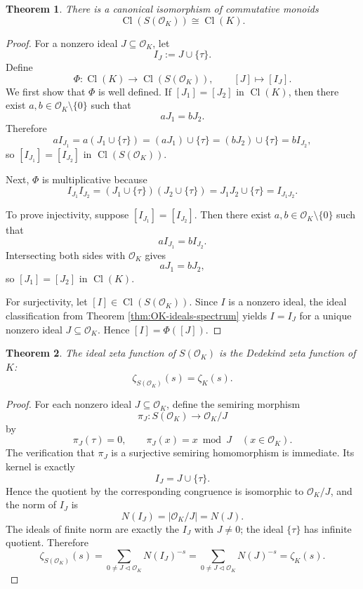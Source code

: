 \documentclass[11pt]{article}
\newtheorem{theorem}{Theorem}[section]
\theoremstyle{definition}
\newcommand{\Cl}{\operatorname{Cl}}
\newcommand{\taup}{\tau}
\newcommand{\OK}{\mathcal O_K}
\begin{document}
\begin{theorem}\label{thm:class-semigroup}
There is a canonical isomorphism of commutative monoids
\[
\Cl(S(\OK))\cong \Cl(K).
\]
\end{theorem}

\begin{proof}
For a nonzero ideal \(J\subseteq \OK\), let
\[
I_J:=J\cup\{\taup\}.
\]
Define
\[
\Phi:\Cl(K)\longrightarrow \Cl(S(\OK)),
\qquad
[J]\longmapsto [I_J].
\]
We first show that \(\Phi\) is well defined.  If \([J_1]=[J_2]\) in \(\Cl(K)\), then there exist \(a,b\in\OK\setminus\{0\}\) such that
\[
aJ_1=bJ_2.
\]
Therefore
\[
aI_{J_1}=a(J_1\cup\{\taup\})=(aJ_1)\cup\{\taup\}=(bJ_2)\cup\{\taup\}=bI_{J_2},
\]
so \([I_{J_1}]=[I_{J_2}]\) in \(\Cl(S(\OK))\).

Next, \(\Phi\) is multiplicative because
\[
I_{J_1}I_{J_2}=(J_1\cup\{\taup\})(J_2\cup\{\taup\})=J_1J_2\cup\{\taup\}=I_{J_1J_2}.
\]

To prove injectivity, suppose \([I_{J_1}]=[I_{J_2}]\).  Then there exist \(a,b\in\OK\setminus\{0\}\) such that
\[
aI_{J_1}=bI_{J_2}.
\]
Intersecting both sides with \(\OK\) gives
\[
aJ_1=bJ_2,
\]
so \([J_1]=[J_2]\) in \(\Cl(K)\).

For surjectivity, let \([I]\in \Cl(S(\OK))\).  Since \(I\) is a nonzero ideal, the ideal classification from Theorem \ref{thm:OK-ideals-spectrum} yields \(I=I_J\) for a unique nonzero ideal \(J\subseteq \OK\).  Hence \([I]=\Phi([J])\).
\end{proof}

\begin{theorem}\label{thm:Dedekind-zeta}
The ideal zeta function of \(S(\OK)\) is the Dedekind zeta function of \(K\):
\[
\zeta_{S(\OK)}(s)=\zeta_K(s).
\]
\end{theorem}

\begin{proof}
For each nonzero ideal \(J\subseteq\OK\), define the semiring morphism
\[
\pi_J:S(\OK)\longrightarrow \OK/J
\]
by
\[
\pi_J(\taup)=0,
\qquad
\pi_J(x)=x\bmod J\quad (x\in\OK).
\]
The verification that \(\pi_J\) is a surjective semiring homomorphism is immediate.  Its kernel is exactly
\[
I_J=J\cup\{\taup\}.
\]
Hence the quotient by the corresponding congruence is isomorphic to \(\OK/J\), and the norm of \(I_J\) is
\[
N(I_J)=|\OK/J|=N(J).
\]
The ideals of finite norm are exactly the \(I_J\) with \(J\neq0\); the ideal \(\{\taup\}\) has infinite quotient.  Therefore
\[
\zeta_{S(\OK)}(s)=\sum_{0\neq J\triangleleft \OK} N(I_J)^{-s}
=\sum_{0\neq J\triangleleft \OK} N(J)^{-s}
=\zeta_K(s).
\]
\end{proof}
\end{document}
